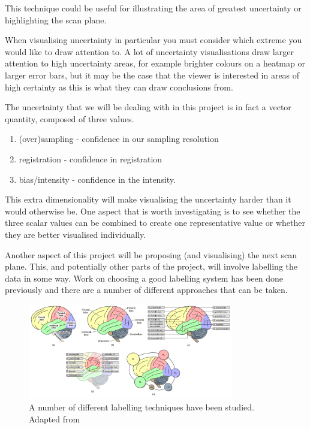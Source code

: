 \documentclass[
  oneside,
  11pt, a4paper,
  footinclude=true,
  headinclude=true,
  cleardoublepage=empty
]{scrbook}
\begin{document}
This technique could be useful for illustrating the area of greatest uncertainty or highlighting the scan plane.

When visualising uncertainty in particular you must consider which extreme you would like to draw attention to. A lot of uncertainty visualisations draw larger attention to high uncertainty areas, for example brighter colours on a heatmap or larger error bars, but it may be the case that the viewer is interested in areas of high certainty as this is what they can draw conclusions from.

The uncertainty that we will be dealing with in this project is in fact a vector quantity, composed of three values. 

\begin{enumerate}
	\item (over)sampling - confidence in our sampling resolution
	\item registration - confidence in registration
	\item bias/intensity - confidence in the intensity.
\end{enumerate}

This extra dimensionality will make visualising the uncertainty harder than it would otherwise be. One aspect that is worth investigating is to see whether the three scalar values can be combined to create one representative value or whether they are better visualised individually.

Another aspect of this project will be proposing (and visualising) the next scan plane. This, and potentially other parts of the project, will involve labelling the data in some way. Work on choosing a good labelling system has been done previously and there are a number of different approaches that can be taken\cite{labelling}.

\begin{figure}[h]
    \centering
	\includegraphics[width=0.8\textwidth]{images/labels.png}
    \caption{A number of different labelling techniques have been studied. Adapted from \cite{labelling}}
    \label{fig:labels}
\end{figure}
\end{document}
